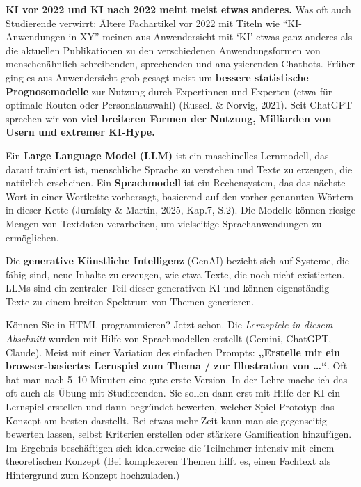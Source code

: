 \documentclass[
  ngerman,
  letterpaper,
  DIV=11]{scrreprt}
\begin{document}
\textbf{KI vor 2022 und KI nach 2022 meint meist etwas anderes.} Was oft
auch Studierende verwirrt: Ältere Fachartikel vor 2022 mit Titeln wie
``KI-Anwendungen in XY'' meinen aus Anwendersicht mit `KI' etwas ganz
anderes als die aktuellen Publikationen zu den verschiedenen
Anwendungsformen von menschenähnlich schreibenden, sprechenden und
analysierenden Chatbots. Früher ging es aus Anwendersicht grob gesagt
meist um \textbf{bessere statistische Prognosemodelle} zur Nutzung durch
Expertinnen und Experten (etwa für optimale Routen oder Personalauswahl)
(Russell \& Norvig, 2021). Seit ChatGPT sprechen wir von \textbf{viel
breiteren Formen der Nutzung, Milliarden von Usern und extremer
KI-Hype.}

Ein \textbf{Large Language Model (LLM)} ist ein maschinelles Lernmodell,
das darauf trainiert ist, menschliche Sprache zu verstehen und Texte zu
erzeugen, die natürlich erscheinen. Ein \textbf{Sprachmodell} ist ein
Rechensystem, das das nächste Wort in einer Wortkette vorhersagt,
basierend auf den vorher genannten Wörtern in dieser Kette (Jurafsky \&
Martin, 2025, Kap.7, S.2). Die Modelle können riesige Mengen von
Textdaten verarbeiten, um vielseitige Sprachanwendungen zu ermöglichen.

Die \textbf{generative Künstliche Intelligenz} (GenAI) bezieht sich auf
Systeme, die fähig sind, neue Inhalte zu erzeugen, wie etwa Texte, die
noch nicht existierten. LLMs sind ein zentraler Teil dieser generativen
KI und können eigenständig Texte zu einem breiten Spektrum von Themen
generieren.

\begin{tcolorbox}[enhanced jigsaw, left=2mm, bottomrule=.15mm, arc=.35mm, rightrule=.15mm, colframe=quarto-callout-tip-color-frame, coltitle=black, colback=white, toprule=.15mm, toptitle=1mm, colbacktitle=quarto-callout-tip-color!10!white, title=\textcolor{quarto-callout-tip-color}{\faLightbulb}\hspace{0.5em}{Tipp: Mini-Interaktionen einfach als HTML erstellen}, opacitybacktitle=0.6, leftrule=.75mm, bottomtitle=1mm, titlerule=0mm, opacityback=0, breakable]

Können Sie in HTML programmieren? Jetzt schon. Die \emph{Lernspiele in
diesem Abschnitt} wurden mit Hilfe von Sprachmodellen erstellt (Gemini,
ChatGPT, Claude). Meist mit einer Variation des einfachen Prompts:
\textbf{„Erstelle mir ein browser-basiertes Lernspiel zum Thema / zur
Illustration von \ldots``}. Oft hat man nach 5--10 Minuten eine gute
erste Version. In der Lehre mache ich das oft auch als Übung mit
Studierenden. Sie sollen dann erst mit Hilfe der KI ein Lernspiel
erstellen und dann begründet bewerten, welcher Spiel-Prototyp das
Konzept am besten darstellt. Bei etwas mehr Zeit kann man sie
gegenseitig bewerten lassen, selbst Kriterien erstellen oder stärkere
Gamification hinzufügen. Im Ergebnis beschäftigen sich idealerweise die
Teilnehmer intensiv mit einem theoretischen Konzept (Bei komplexeren
Themen hilft es, einen Fachtext als Hintergrund zum Konzept
hochzuladen.)

\end{tcolorbox}
\end{document}
